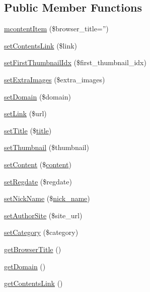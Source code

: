 \subsection*{Public Member Functions}
\begin{DoxyCompactItemize}
\item 
\hyperlink{classmcontentItem_a9cf9b439a6c29b1354b298ab6023ea3e}{mcontent\+Item} (\$browser\+\_\+title='')
\item 
\hyperlink{classmcontentItem_a8d8267fc8c63ad032d8dfa694b54d30b}{set\+Contents\+Link} (\$link)
\item 
\hyperlink{classmcontentItem_a97b29510d9386112296071cb06bd68dd}{set\+First\+Thumbnail\+Idx} (\$first\+\_\+thumbnail\+\_\+idx)
\item 
\hyperlink{classmcontentItem_a9907cf978c2b2dafbaeb307faea0874d}{set\+Extra\+Images} (\$extra\+\_\+images)
\item 
\hyperlink{classmcontentItem_adaf816a617e10b21c1b7cfa3080e4a25}{set\+Domain} (\$domain)
\item 
\hyperlink{classmcontentItem_a6c192aee58d7bca3d8933d387309b2ab}{set\+Link} (\$url)
\item 
\hyperlink{classmcontentItem_adb687bee610481753feb8bdd14fab049}{set\+Title} (\$\hyperlink{ko_8install_8php_a5b072c5fd1d2228c6ba5cee13cd142e3}{title})
\item 
\hyperlink{classmcontentItem_a956c763f26136b4e7a96ab07c04a1957}{set\+Thumbnail} (\$thumbnail)
\item 
\hyperlink{classmcontentItem_afb9763a013942bd40ab5a3b1c7491910}{set\+Content} (\$\hyperlink{classcontent}{content})
\item 
\hyperlink{classmcontentItem_aeb646f2283bfb0a13b7d9f544058f962}{set\+Regdate} (\$regdate)
\item 
\hyperlink{classmcontentItem_a4b702963538643aac56d9a3312a06bee}{set\+Nick\+Name} (\$\hyperlink{ko_8install_8php_a151ecae87a1f3d7e257aa089803086bd}{nick\+\_\+name})
\item 
\hyperlink{classmcontentItem_adaa9ad60dd8f5373b9f2258a6effe70c}{set\+Author\+Site} (\$site\+\_\+url)
\item 
\hyperlink{classmcontentItem_a004c63ef8da549d29d201b4946372c5e}{set\+Category} (\$category)
\item 
\hyperlink{classmcontentItem_a6fe964acc2f33039f90a6ed33ae03ba9}{get\+Browser\+Title} ()
\item 
\hyperlink{classmcontentItem_a29a4fb4f4bedd748ec93238be37a22fb}{get\+Domain} ()
\item 
\hyperlink{classmcontentItem_a60fe1f5cbd47314c2910a8782a3252a9}{get\+Contents\+Link} ()

\end{DoxyCompactItemize}
